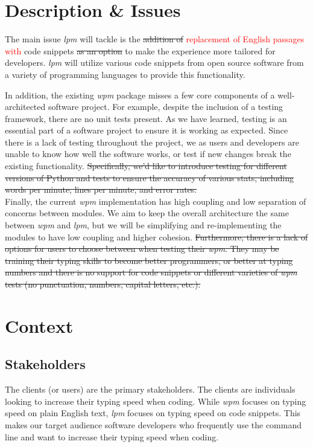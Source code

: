 \documentclass{article}
\begin{document}
\section*{Description \& Issues}

The main issue \textit{lpm} will tackle is the \sout{addition of} \textcolor{red}{replacement of English passages with} code snippets \sout{as an option} to make the experience more tailored for developers. \textit{lpm} will utilize various code snippets from open source software from a variety of programming languages to provide this functionality.

In addition, the existing \textit{wpm} package misses a few core components of a well-architected software project. For example, despite the inclusion of a testing framework, there are no unit tests present. As we have learned, testing is an essential part of a software project to ensure it is working as expected. Since there is a lack of testing throughout the project, we as users and developers are unable to know how well the software works, or test if new changes break the existing functionality. \sout{Specifically, we'd like to introduce testing for different versions of Python and tests to ensure the accuracy of various stats, including words per minute, lines per minute, and error rates.} \\

Finally, the current \textit{wpm} implementation has high coupling and low separation of concerns between modules. We aim to keep the overall architecture the same between \textit{wpm} and \textit{lpm}, but we will be simplifying and re-implementing the modules to have low coupling and higher cohesion. \sout{Furthermore, there is a lack of options for users to choose between when testing their \textit{wpm}. They may be training their typing skills to become better programmers, or better at typing numbers and there is no support for code snippets or different varieties of \textit{wpm} tests (no punctuation, numbers, capital letters, etc.).}

\section*{Context}
\subsection*{Stakeholders}

The clients (or users) are the primary stakeholders. The clients are individuals looking to increase their typing speed when coding. While \textit{wpm} focuses on typing speed on plain English text, \textit{lpm} focuses on typing speed on code snippets. This makes our target audience software developers who frequently use the command line and want to increase their typing speed when coding.\\
\end{document}
